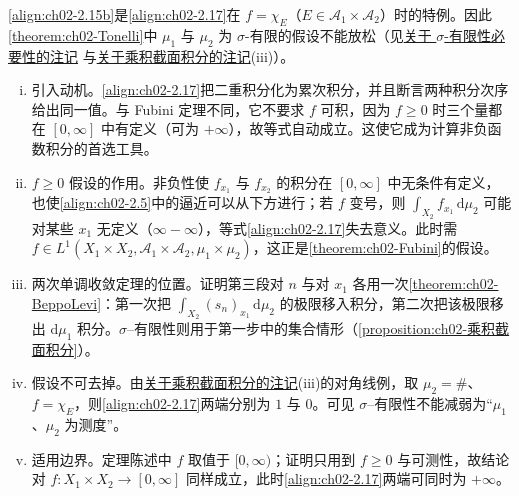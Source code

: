 \documentclass[../../main.tex]{subfiles}%
\begin{document}
\begin{remark}\label{remark:ch02-Tonelli条件}\label{remark:ch02-截口注}
\eqref{align:ch02-2.15b}是\eqref{align:ch02-2.17}在 $f=\chi_E$（$E\in\mathscr A_1\times\mathscr A_2$）时的特例。因此\cref{theorem:ch02-Tonelli}中 $\mu_1$ 与 $\mu_2$ 为 $\sigma$-有限的假设不能放松（见\hyperref[remark:ch02-sigma有限必要]{关于 $\sigma$-有限性必要性的注记} 与\hyperref[remark:ch02-乘积截面积分动机]{关于乘积截面积分的注记}(iii)）。
\end{remark}

\begin{remark}\label{remark:ch02-Tonelli动机}
\begin{enumerate}[(i)]
\item 引入动机。\eqref{align:ch02-2.17}把二重积分化为累次积分，并且断言两种积分次序给出同一值。与 Fubini 定理不同，它不要求 $f$ 可积，因为 $f\geqslant0$ 时三个量都在 $[0,\infty]$ 中有定义（可为 $+\infty$），故等式自动成立。这使它成为计算非负函数积分的首选工具。
\item $f\geqslant0$ 假设的作用。非负性使 $f_{x_1}$ 与 $f_{x_2}$ 的积分在 $[0,\infty]$ 中无条件有定义，也使\eqref{align:ch02-2.5}中的逼近可以从下方进行；若 $f$ 变号，则 $\int_{X_2}f_{x_1}\,\mathrm{d}\mu_2$ 可能对某些 $x_1$ 无定义（$\infty-\infty$），等式\eqref{align:ch02-2.17}失去意义。此时需 $f\in L^1(X_1\times X_2,\mathscr A_1\times\mathscr A_2,\mu_1\times\mu_2)$，这正是\cref{theorem:ch02-Fubini}的假设。
\item 两次单调收敛定理的位置。证明第三段对 $n$ 与对 $x_1$ 各用一次\cref{theorem:ch02-BeppoLevi}：第一次把 $\int_{X_2}(s_n)_{x_1}\,\mathrm{d}\mu_2$ 的极限移入积分，第二次把该极限移出 $\mathrm{d}\mu_1$ 积分。$\sigma$--有限性则用于第一步中的集合情形（\cref{proposition:ch02-乘积截面积分}）。
\item 假设不可去掉。由\hyperref[remark:ch02-乘积截面积分动机]{关于乘积截面积分的注记}(iii)的对角线例，取 $\mu_2=\#$、$f=\chi_E$，则\eqref{align:ch02-2.17}两端分别为 $1$ 与 $0$。可见 $\sigma$--有限性不能减弱为“$\mu_1$、$\mu_2$ 为测度”。
\item 适用边界。定理陈述中 $f$ 取值于 $[0,\infty)$；证明只用到 $f\geqslant0$ 与可测性，故结论对 $f:X_1\times X_2\to[0,\infty]$ 同样成立，此时\eqref{align:ch02-2.17}两端可同时为 $+\infty$。
\end{enumerate}
\end{remark}
\end{document}
